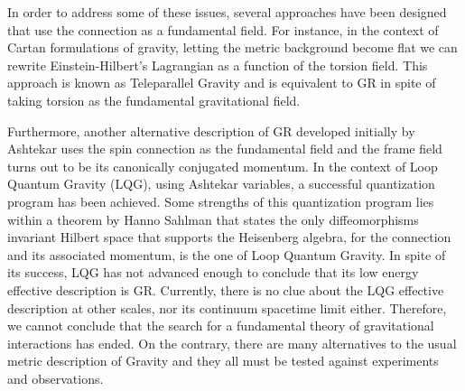 \documentclass[%
  showpacs,showkeys,prd,superscriptaddress]{revtex4-1}
\begin{document}
In order to address some of these issues, several approaches have been designed that use the connection as a fundamental field. For instance, in the context of Cartan formulations of gravity, letting the metric background become flat we can rewrite Einstein-Hilbert's Lagrangian as a function of the torsion field. This approach is known as Teleparallel Gravity and is equivalent to GR in spite of taking torsion as the fundamental gravitational field.

Furthermore, another alternative description of GR developed initially by Ashtekar uses the spin connection as the fundamental field and the frame field turns out to be its canonically conjugated momentum. In the context of Loop Quantum Gravity (LQG), using Ashtekar variables, a successful quantization program has been achieved. Some  strengths of this quantization program lies within a theorem by Hanno Sahlman that states the only diffeomorphisms invariant Hilbert space that supports the Heisenberg algebra, for the connection and its associated momentum, is the one of Loop Quantum Gravity. In spite of its success, LQG has not advanced enough to conclude that its low energy effective description is GR. Currently, there is no clue about the LQG effective description at other scales,  nor its continuum spacetime limit either. Therefore, we cannot conclude that the search for a fundamental theory of gravitational interactions has ended. On the contrary, there are many alternatives to the usual metric description of Gravity and they all must be tested against experiments and observations.
\end{document}
